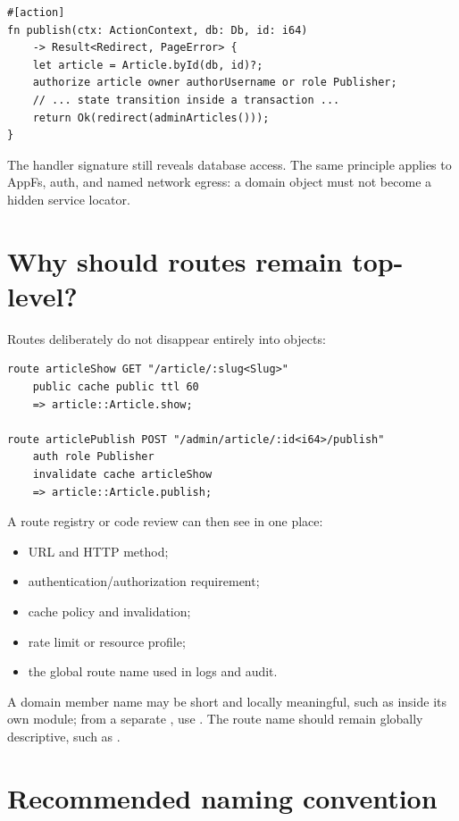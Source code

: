\begin{lstlisting}
#[action]
fn publish(ctx: ActionContext, db: Db, id: i64)
    -> Result<Redirect, PageError> {
    let article = Article.byId(db, id)?;
    authorize article owner authorUsername or role Publisher;
    // ... state transition inside a transaction ...
    return Ok(redirect(adminArticles()));
}
\end{lstlisting}

The handler signature still reveals database access. The same principle applies to AppFs, auth, and named network egress: a domain object must not become a hidden service locator.

\section{Why should routes remain top-level?}

Routes deliberately do not disappear entirely into objects:

\begin{lstlisting}[language=Velran]
route articleShow GET "/article/:slug<Slug>"
    public cache public ttl 60
    => article::Article.show;

route articlePublish POST "/admin/article/:id<i64>/publish"
    auth role Publisher
    invalidate cache articleShow
    => article::Article.publish;
\end{lstlisting}

A route registry or code review can then see in one place:

\begin{itemize}
  \item URL and HTTP method;
  \item authentication/authorization requirement;
  \item cache policy and invalidation;
  \item rate limit or resource profile;
  \item the global route name used in logs and audit.
\end{itemize}

A domain member name may be short and locally meaningful, such as  inside its own module; from a separate , use . The route name should remain globally descriptive, such as .

\section{Recommended naming convention}

